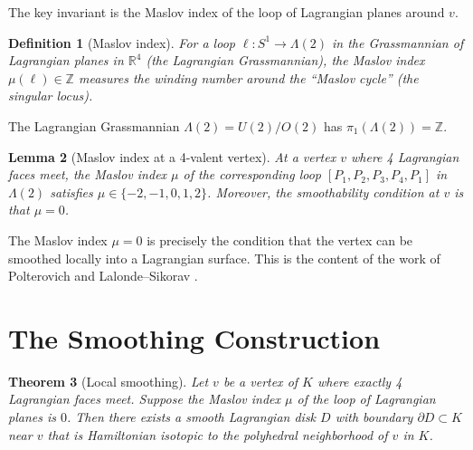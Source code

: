 \documentclass[12pt]{article}
\newtheorem{theorem}{Theorem}
\newtheorem{lemma}[theorem]{Lemma}
\newtheorem{definition}[theorem]{Definition}
\begin{document}
The key invariant is the Maslov index of the loop of Lagrangian planes around $v$.

\begin{definition}[Maslov index]
For a loop $\ell: S^1 \to \Lambda(2)$ in the Grassmannian of Lagrangian planes in $\mathbb{R}^4$ (the Lagrangian Grassmannian), the Maslov index $\mu(\ell) \in \mathbb{Z}$ measures the winding number around the ``Maslov cycle'' (the singular locus).
\end{definition}

The Lagrangian Grassmannian $\Lambda(2) = U(2)/O(2)$ has $\pi_1(\Lambda(2)) = \mathbb{Z}$.

\begin{lemma}[Maslov index at a 4-valent vertex]\label{lem:maslov}
At a vertex $v$ where 4 Lagrangian faces meet, the Maslov index $\mu$ of the corresponding loop $[P_1, P_2, P_3, P_4, P_1]$ in $\Lambda(2)$ satisfies $\mu \in \{-2, -1, 0, 1, 2\}$. Moreover, the smoothability condition at $v$ is that $\mu = 0$.
\end{lemma}

The Maslov index $\mu = 0$ is precisely the condition that the vertex can be smoothed locally into a Lagrangian surface. This is the content of the work of Polterovich \cite{Polterovich1991} and Lalonde--Sikorav \cite{LS1991}.

\section{The Smoothing Construction}

\begin{theorem}[Local smoothing]\label{thm:local-smooth}
Let $v$ be a vertex of $K$ where exactly 4 Lagrangian faces meet. Suppose the Maslov index $\mu$ of the loop of Lagrangian planes is $0$. Then there exists a smooth Lagrangian disk $D$ with boundary $\partial D \subset K$ near $v$ that is Hamiltonian isotopic to the polyhedral neighborhood of $v$ in $K$.
\end{theorem}
\end{document}
